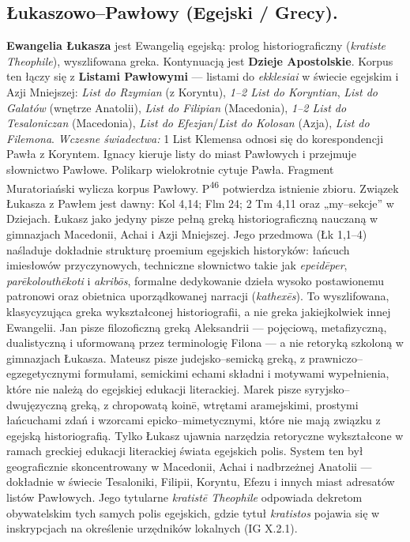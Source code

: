 \subsection{Łukaszowo–Pawłowy (Egejski / Grecy).}
\textbf{Ewangelia Łukasza} jest Ewangelią egejską: prolog historiograficzny (\textit{kratiste Theophile}), wyszlifowana greka.
Kontynuacją jest \textbf{Dzieje Apostolskie}.
Korpus ten łączy się z \textbf{Listami Pawłowymi} — listami do \textit{ekklesiai} w świecie egejskim i Azji Mniejszej: \textit{List do Rzymian} (z Koryntu), \textit{1–2 List do Koryntian}, \textit{List do Galatów} (wnętrze Anatolii), \textit{List do Filipian} (Macedonia), \textit{1–2 List do Tesaloniczan} (Macedonia), \textit{List do Efezjan}/\textit{List do Kolosan} (Azja), \textit{List do Filemona}.
\emph{Wczesne świadectwa:} 1 List Klemensa odnosi się do korespondencji Pawła z Koryntem.
Ignacy kieruje listy do miast Pawłowych i przejmuje słownictwo Pawłowe.
Polikarp wielokrotnie cytuje Pawła.
Fragment Muratoriański wylicza korpus Pawłowy.
P\textsuperscript{46} potwierdza istnienie zbioru.
Związek Łukasza z Pawłem jest dawny: Kol 4,14; Flm 24; 2 Tm 4,11 oraz „my–sekcje” w Dziejach.
Łukasz jako jedyny pisze pełną greką historiograficzną nauczaną w gimnazjach Macedonii, Achai i Azji Mniejszej.
Jego przedmowa (Łk 1,1–4) naśladuje dokładnie strukturę proemium egejskich historyków: łańcuch imiesłowów przyczynowych, techniczne słownictwo takie jak \textit{epeidēper}, \textit{parēkolouthēkoti} i \textit{akribōs}, formalne dedykowanie dzieła wysoko postawionemu patronowi oraz obietnica uporządkowanej narracji (\textit{kathexēs}).
To wyszlifowana, klasycyzująca greka wykształconej historiografii, a nie greka jakiejkolwiek innej Ewangelii.
Jan pisze filozoficzną greką Aleksandrii — pojęciową, metafizyczną, dualistyczną i uformowaną przez terminologię Filona — a nie retoryką szkoloną w gimnazjach Łukasza.
Mateusz pisze judejsko–semicką greką, z prawniczo–egzegetycznymi formułami, semickimi echami składni i motywami wypełnienia, które nie należą do egejskiej edukacji literackiej.
Marek pisze syryjsko–dwujęzyczną greką, z chropowatą koinē, wtrętami aramejskimi, prostymi łańcuchami zdań i wzorcami epicko–mimetycznymi, które nie mają związku z egejską historiografią.
Tylko Łukasz ujawnia narzędzia retoryczne wykształcone w ramach greckiej edukacji literackiej świata egejskich polis.
System ten był geograficznie skoncentrowany w Macedonii, Achai i nadbrzeżnej Anatolii — dokładnie w świecie Tesaloniki, Filipii, Koryntu, Efezu i innych miast adresatów listów Pawłowych.
Jego tytularne \textit{kratistē Theophile} odpowiada dekretom obywatelskim tych samych polis egejskich, gdzie tytuł \textit{kratistos} pojawia się w inskrypcjach na określenie urzędników lokalnych (IG X.2.1).
